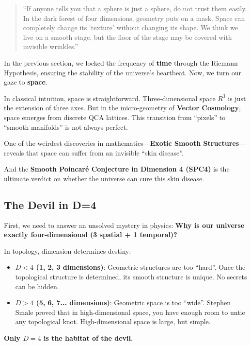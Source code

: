 \begin{quote}
``If anyone tells you that a sphere is just a sphere, do not trust them easily. In the dark forest of four dimensions, geometry puts on a mask. Space can completely change its `texture' without changing its shape. We think we live on a smooth stage, but the floor of the stage may be covered with invisible wrinkles.''
\end{quote}

In the previous section, we locked the frequency of \textbf{time} through the Riemann Hypothesis, ensuring the stability of the universe's heartbeat. Now, we turn our gaze to \textbf{space}.

In classical intuition, space is straightforward. Three-dimensional space $R^3$ is just the extension of three axes. But in the micro-geometry of \textbf{Vector Cosmology}, space emerges from discrete QCA lattices. This transition from ``pixels'' to ``smooth manifolds'' is not always perfect.

One of the weirdest discoveries in mathematics—\textbf{Exotic Smooth Structures}—reveals that space can suffer from an invisible ``skin disease''.

And the \textbf{Smooth Poincaré Conjecture in Dimension 4 (SPC4)} is the ultimate verdict on whether the universe can cure this skin disease.

\subsection{The Devil in D=4}

First, we need to answer an unsolved mystery in physics: \textbf{Why is our universe exactly four-dimensional (3 spatial + 1 temporal)?}

In topology, dimension determines destiny:

\begin{itemize}
\item \textbf{$D < 4$ (1, 2, 3 dimensions)}: Geometric structures are too ``hard''. Once the topological structure is determined, its smooth structure is unique. No secrets can be hidden.

\item \textbf{$D > 4$ (5, 6, 7... dimensions)}: Geometric space is too ``wide''. Stephen Smale proved that in high-dimensional space, you have enough room to untie any topological knot. High-dimensional space is large, but simple.
\end{itemize}

\textbf{Only $D = 4$ is the habitat of the devil.}

